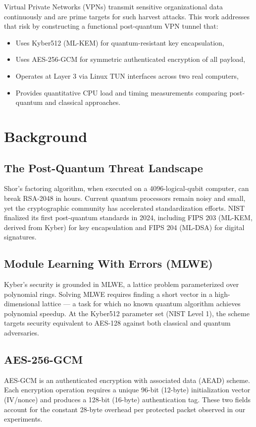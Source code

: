 \documentclass[conference,onecolumn]{IEEEtran}
\begin{document}
Virtual Private Networks (VPNs) transmit sensitive organizational data continuously and are prime targets for such harvest attacks. This work addresses that risk by constructing a functional post-quantum VPN tunnel that:
\begin{itemize}
    \item Uses Kyber512 (ML-KEM) for quantum-resistant key encapsulation,
    \item Uses AES-256-GCM for symmetric authenticated encryption of all payload,
    \item Operates at Layer 3 via Linux TUN interfaces across two real computers,
    \item Provides quantitative CPU load and timing measurements comparing post-quantum and classical approaches.
\end{itemize}

\section{Background}

\subsection{The Post-Quantum Threat Landscape}
Shor's factoring algorithm, when executed on a 4096-logical-qubit computer, can break RSA-2048 in hours. Current quantum processors remain noisy and small, yet the cryptographic community has accelerated standardization efforts. NIST finalized its first post-quantum standards in 2024, including FIPS 203 (ML-KEM, derived from Kyber) for key encapsulation and FIPS 204 (ML-DSA) for digital signatures.

\subsection{Module Learning With Errors (MLWE)}
Kyber's security is grounded in MLWE, a lattice problem parameterized over polynomial rings. Solving MLWE requires finding a short vector in a high-dimensional lattice — a task for which no known quantum algorithm achieves polynomial speedup. At the Kyber512 parameter set (NIST Level 1), the scheme targets security equivalent to AES-128 against both classical and quantum adversaries.

\subsection{AES-256-GCM}
AES-GCM is an authenticated encryption with associated data (AEAD) scheme. Each encryption operation requires a unique 96-bit (12-byte) initialization vector (IV/nonce) and produces a 128-bit (16-byte) authentication tag. These two fields account for the constant 28-byte overhead per protected packet observed in our experiments.
\end{document}
